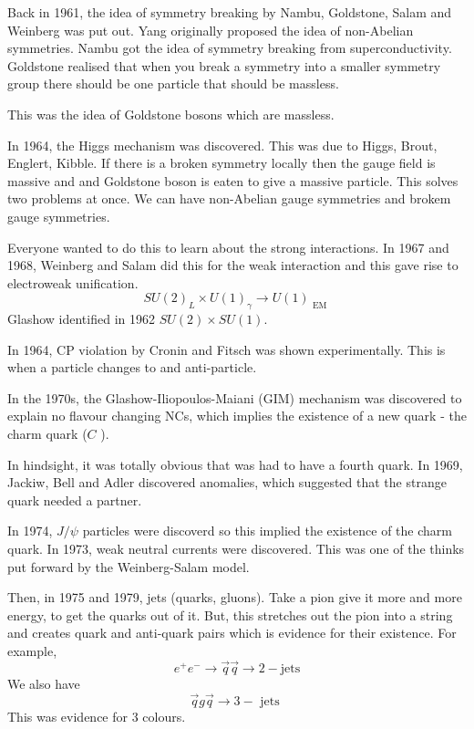 \documentclass[11pt, oneside]{article}   	%
\theoremstyle{slanted}
\begin{document}
Back in 1961, the idea of symmetry breaking 
by Nambu, Goldstone, Salam and Weinberg 
was put out. Yang originally proposed the 
idea of non-Abelian symmetries. 
Nambu got the idea of symmetry breaking 
from superconductivity. 
Goldstone realised that 
when you break a symmetry 
into a smaller symmetry group 
there should be one particle 
that should be massless. 

This was the idea of Goldstone bosons 
which are massless. 

In 1964, 
the Higgs mechanism was discovered. This 
was due to Higgs, Brout, Englert, Kibble. 
If there is a broken symmetry locally then 
the gauge field is massive and 
and Goldstone boson is eaten to give a massive particle. 
This solves two problems at once. 
We can have non-Abelian gauge symmetries 
and brokem gauge symmetries. 

Everyone wanted to do this 
to learn about the strong interactions. 
In 1967 and 1968,
Weinberg and Salam did this 
for the weak interaction and 
this gave rise to electroweak 
unification. 
\[
SU ( 2 )_ L \times U \left( 1  \right)  _{ \gamma } 
\to U (1 ) _{ \text{ EM } } 
\] Glashow identified in 1962 $ SU ( 2) \times SU ( 1 ) $. 

In 1964, CP violation 
by Cronin and Fitsch was 
shown experimentally. 
This is when a particle changes to 
and anti-particle. 

In the 1970s, 
the Glashow-Iliopoulos-Maiani (GIM) 
mechanism was discovered to 
explain no flavour changing 
NCs, which implies the existence of a 
new quark - the charm quark ($ C $  ). 

In hindsight, it was 
totally obvious that was had to 
have a fourth quark. 
In 1969, Jackiw, Bell and Adler 
discovered anomalies, 
which suggested that the strange quark 
needed a partner. 

In 1974, $ J / \psi $ 
particles were discoverd so this implied 
the existence of the charm quark.
In 1973, weak neutral 
currents were discovered. 
This was one of the thinks 
put forward by the Weinberg-Salam model. 

Then, in 1975 and 1979, 
jets (quarks, gluons). 
Take a pion give it more and more energy, 
to get the quarks out of it. 
But, this stretches out 
the pion into a string and 
creates quark and anti-quark pairs
which is evidence for their existence. 
For example, 
\[
e ^ + e ^  - \to \vec{q} \vec{q} \to 2 -\text{jets}
\] 
We also have 
\[
\vec{q} g \vec{q} \to 3 - \text{ jets }
\] This 
was evidence for 3 colours. 
\end{document}
